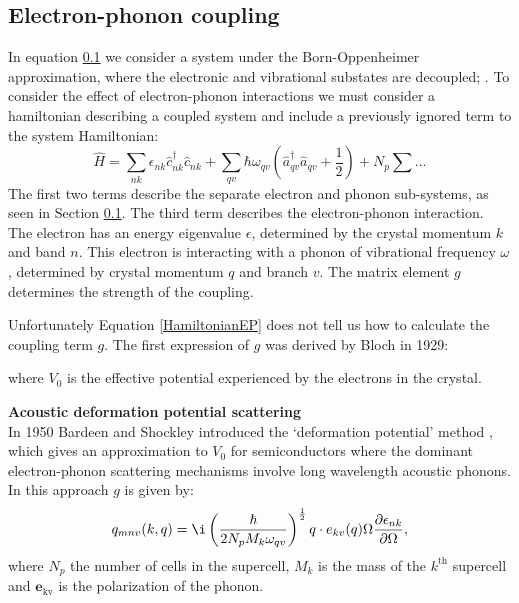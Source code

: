 
\subsection{Electron-phonon coupling}
In equation \ref{} we consider a system under the Born-Oppenheimer approximation, where the electronic and vibrational substates are decoupled; $ $.%
To consider the effect of electron-phonon interactions we must consider a hamiltonian describing a coupled system and include a previously ignored term to the system Hamiltonian:\cite{Giustino2016}
\begin{equation} \label{HamiltonianEP}
    \hat{H} = \sum_{nk}\epsilon_{nk}\hat{c}^{\dagger}_{nk}\hat{c}_{nk} + \sum_{qv}\hbar\omega_{qv}(\hat{a}^{\dagger}_{qv}\hat{a}_{qv}+\frac{1}{2})+N_p\sum...
\end{equation}
The first two terms describe the separate electron and phonon sub-systems, as seen in Section \ref{}. The third term describes the electron-phonon interaction. The electron has an energy eigenvalue $\epsilon$, determined by the crystal momentum $k$ and band $n$. This electron is interacting with a phonon of vibrational frequency $\omega$  , determined by crystal momentum $q$ and branch $v$. The matrix element $g$ determines the strength of the coupling. 

Unfortunately Equation \ref{HamiltonianEP} does not tell us how to calculate the coupling term $g$. The first expression of $g$ was derived by Bloch in 1929:
    
where $V_0$ is the effective potential experienced by the electrons in the crystal.

\textbf{Acoustic deformation potential scattering}\\
 In 1950 Bardeen and Shockley introduced the `deformation potential' method \cite{}, which gives an approximation to $V_0$ for semiconductors where the dominant electron-phonon scattering mechanisms involve long wavelength acoustic phonons.\cite{Giustino2016} In this approach $g$ is given by:
\begin{equation} \label{couplingterm}  %
   q_{mnv}(k,q) = \i\left(\frac{\hbar}{2N_pM_k\omega_{qv}}\right)^{\frac{1}{2}}q\cdot e_{kv}(q) \Omega\frac{\partial\epsilon_{nk}}{\partial\Omega},
\end{equation}
where $N_p$ the number of cells in the supercell, $M_k$ is the mass of the $k^{\textrm{th}}$ supercell and $\textbf{e}_\textrm{{kv}}$ is the polarization of the phonon. 

